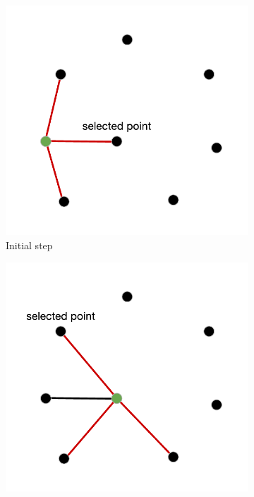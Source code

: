 \begin{figure}[h!]
  \centering
  \begin{subfigure}[b]{0.49\linewidth}
    \includegraphics[width=\linewidth]{media/grasp_fase1.pdf}
     \caption{Initial step}
  \end{subfigure}
  \begin{subfigure}[b]{0.49\linewidth}
    \includegraphics[width=\linewidth]{media/grasp_fase2.pdf}

\end{subfigure}
\end{figure}
